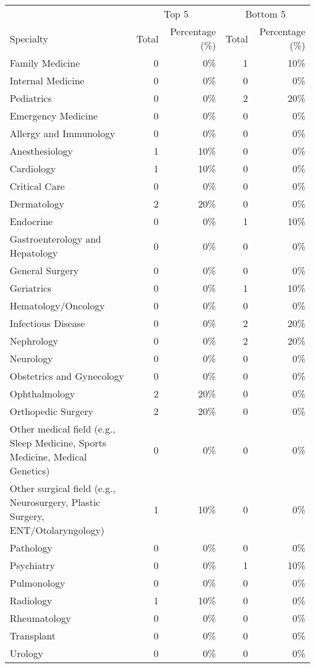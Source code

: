 \begin{tabular}{lrrrr}\toprule
 & \multicolumn{2}{c}{Top 5} & \multicolumn{2}{c}{Bottom 5} \\
\cmidrule(lr){2-3} \cmidrule(lr){4-5}
Specialty & Total & Percentage (\%) & Total & Percentage (\%) \\ \midrule
Family Medicine & 0 & 0\% & 1 & 10\% \\
Internal Medicine & 0 & 0\% & 0 & 0\% \\
Pediatrics & 0 & 0\% & 2 & 20\% \\
\midrule
Emergency Medicine & 0 & 0\% & 0 & 0\% \\
\midrule
Allergy and Immunology & 0 & 0\% & 0 & 0\% \\
Anesthesiology & 1 & 10\% & 0 & 0\% \\
Cardiology & 1 & 10\% & 0 & 0\% \\
Critical Care & 0 & 0\% & 0 & 0\% \\
Dermatology & 2 & 20\% & 0 & 0\% \\
Endocrine & 0 & 0\% & 1 & 10\% \\
Gastroenterology and Hepatology & 0 & 0\% & 0 & 0\% \\
General Surgery & 0 & 0\% & 0 & 0\% \\
Geriatrics & 0 & 0\% & 1 & 10\% \\
Hematology/Oncology & 0 & 0\% & 0 & 0\% \\
Infectious Disease & 0 & 0\% & 2 & 20\% \\
Nephrology & 0 & 0\% & 2 & 20\% \\
Neurology & 0 & 0\% & 0 & 0\% \\
Obstetrics and Gynecology & 0 & 0\% & 0 & 0\% \\
Ophthalmology & 2 & 20\% & 0 & 0\% \\
Orthopedic Surgery & 2 & 20\% & 0 & 0\% \\
Other medical field (e.g., Sleep Medicine, Sports Medicine, Medical Genetics) & 0 & 0\% & 0 & 0\% \\
Other surgical field (e.g., Neurosurgery, Plastic Surgery, ENT/Otolaryngology) & 1 & 10\% & 0 & 0\% \\
Pathology & 0 & 0\% & 0 & 0\% \\
Psychiatry & 0 & 0\% & 1 & 10\% \\
Pulmonology & 0 & 0\% & 0 & 0\% \\
Radiology & 1 & 10\% & 0 & 0\% \\
Rheumatology & 0 & 0\% & 0 & 0\% \\
Transplant & 0 & 0\% & 0 & 0\% \\
Urology & 0 & 0\% & 0 & 0\% \\
\bottomrule\end{tabular}
